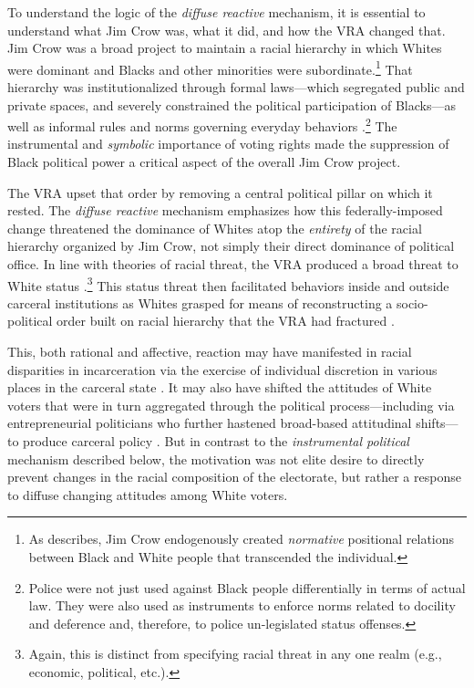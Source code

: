 \documentclass[12pt]{article}
\begin{document}
To understand the logic of the \emph{diffuse reactive} mechanism, it is essential to understand what Jim Crow was, what it did, and how the VRA changed that.  Jim Crow was a broad project to maintain a racial hierarchy in which Whites were dominant and Blacks and other minorities were subordinate.\footnote{As \cite{Blumer:1958ue} describes, Jim Crow endogenously created \emph{normative} positional relations between Black and White people that transcended the individual. }  That hierarchy was institutionalized through formal laws---which segregated public and private spaces, and severely constrained the political participation of Blacks---as well as informal rules and norms governing everyday behaviors \citep{Kennedy:1990vt,Berrey:2016wm}.\footnote{Police were not just used against Black people differentially in terms of actual law.  They were also used as instruments to enforce norms related to docility and deference and, therefore, to police un-legislated status offenses.}  The instrumental and \emph{symbolic} importance of voting rights made the suppression of Black political power a critical aspect of the overall Jim Crow project.

The VRA upset that order by removing a central political pillar on which it rested.  The \emph{diffuse reactive} mechanism emphasizes how this federally-imposed change threatened the dominance of Whites atop the \emph{entirety} of the racial hierarchy organized by Jim Crow, not simply their direct dominance of political office.  In line with theories of racial threat, the VRA produced a broad threat to White status \citep{Blumer:1958ue,Blalock:1967ud}.\footnote{Again, this is distinct from specifying racial threat in any one realm (e.g., economic, political, etc.). }  This status threat then facilitated behaviors inside and outside carceral institutions as Whites grasped for means of reconstructing a socio-political order built on racial hierarchy that the VRA had fractured \citep{Kinder:1981ww,Kinder:2010wj,Banks:2012uz,Jardina:2019tk}.

This, both rational and affective, reaction may have manifested in racial disparities in incarceration via the exercise of individual discretion in various places in the carceral state \citep[xix-xx]{UnitedStates:1982ty}. It may also have shifted the attitudes of White voters that were in turn aggregated through the political process---including via entrepreneurial politicians who further hastened broad-based attitudinal shifts---to produce carceral policy \citep{Weaver:2007vr,Campbell:2013tw,Enns:2015vz,Kuziemko:2015ts}. But in contrast to the \emph{instrumental political} mechanism described below, the motivation was not elite desire to directly prevent changes in the racial composition of the electorate, but rather a response to diffuse changing attitudes among White voters.
\end{document}
